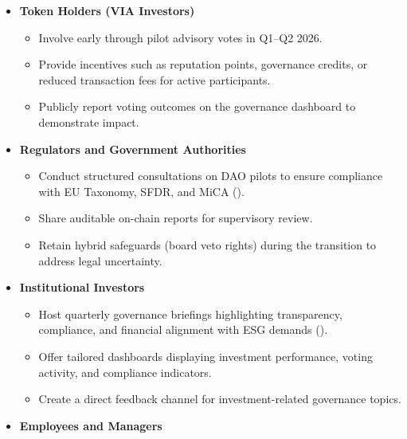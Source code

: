 \documentclass[
  english,
  12pt,
  oneside,
  open=any]{scrbook}
\providecommand{\tightlist}{%
  \setlength{\itemsep}{0pt}\setlength{\parskip}{0pt}}\usepackage{longtable,booktabs,array}
\begin{document}
\begin{itemize}
\tightlist
\item
  \textbf{Token Holders (VIA Investors)}

  \begin{itemize}
  \tightlist
  \item
    Involve early through pilot advisory votes in Q1--Q2 2026.\\
  \item
    Provide incentives such as reputation points, governance credits, or
    reduced transaction fees for active participants.\\
  \item
    Publicly report voting outcomes on the governance dashboard to
    demonstrate impact.
  \end{itemize}
\item
  \textbf{Regulators and Government Authorities}

  \begin{itemize}
  \tightlist
  \item
    Conduct structured consultations on DAO pilots to ensure compliance
    with EU Taxonomy, SFDR, and MiCA
    ().\\
  \item
    Share auditable on-chain reports for supervisory review.\\
  \item
    Retain hybrid safeguards (board veto rights) during the transition
    to address legal uncertainty.
  \end{itemize}
\item
  \textbf{Institutional Investors}

  \begin{itemize}
  \tightlist
  \item
    Host quarterly governance briefings highlighting transparency,
    compliance, and financial alignment with ESG demands
    ().\\
  \item
    Offer tailored dashboards displaying investment performance, voting
    activity, and compliance indicators.\\
  \item
    Create a direct feedback channel for investment-related governance
    topics.
  \end{itemize}
\item
  \textbf{Employees and Managers}


\end{itemize}
\end{document}
